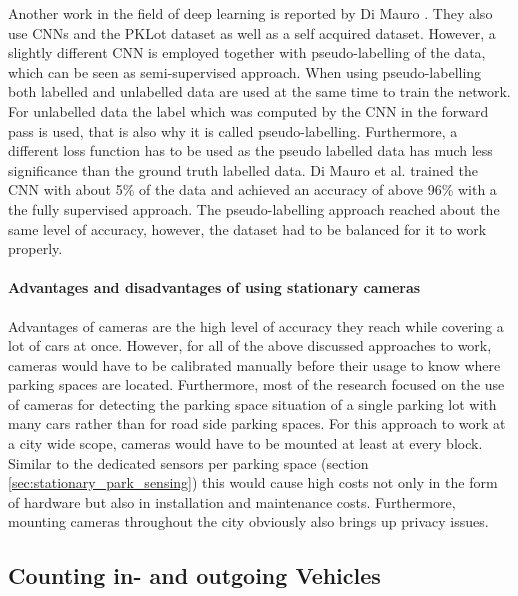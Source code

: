 Another work in the field of deep learning is reported by Di Mauro \cite{DiMauro2016}. They also use CNNs and the PKLot dataset as well as a self acquired dataset. However, a slightly different CNN is employed together with pseudo-labelling of the data, which can be seen as semi-supervised approach. When using pseudo-labelling both labelled and unlabelled data are used at the same time to train the network. For unlabelled data the label which was computed by the CNN in the forward pass is used, that is also why it is called pseudo-labelling. Furthermore, a different loss function has to be used as the pseudo labelled data has much less significance than the ground truth labelled data. Di Mauro et al. trained the CNN with about 5\% of the data and achieved an accuracy of above 96\% with a the fully supervised approach. The pseudo-labelling approach reached about the same level of accuracy, however, the dataset had to be balanced for it to work properly.


\paragraph{Advantages and disadvantages of using stationary cameras}

Advantages of cameras are the high level of accuracy they reach while covering a lot of cars at once. However, for all of the above discussed approaches to work, cameras would have to be calibrated manually before their usage to know where parking spaces are located. Furthermore, most of the research focused on the use of cameras for detecting the parking space situation of a single parking lot with many cars rather than for road side parking spaces. For this approach to work at a city wide scope, cameras would have to be mounted at least at every block. Similar to the dedicated sensors per parking space (section \ref{sec:stationary_park_sensing}) this would cause high costs not only in the form of hardware but also in installation and maintenance costs. Furthermore, mounting cameras throughout the city obviously also brings up privacy issues.





\subsection{Counting in- and outgoing Vehicles}
\label{sec:counting_in_out_park_sensing}

